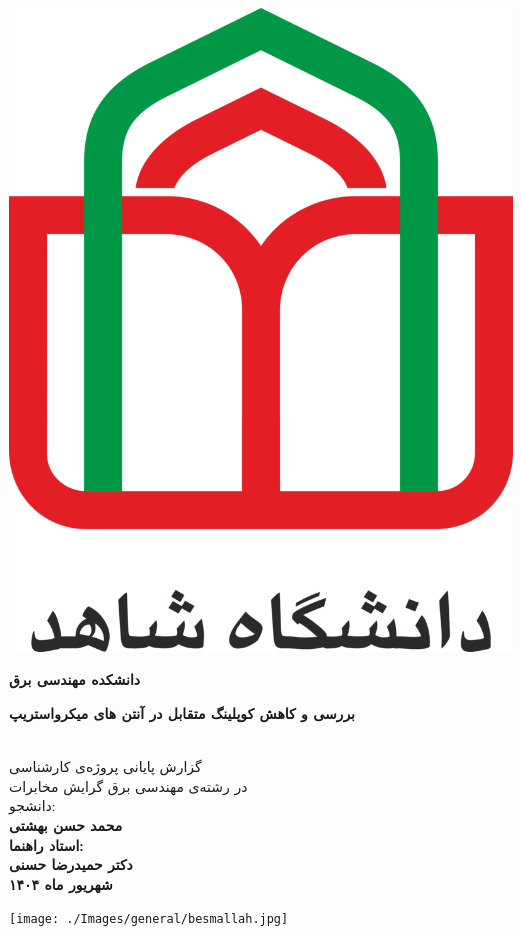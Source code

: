 
\thispagestyle{empty}
\vspace*{-28mm}
\centerline{\includegraphics[scale=0.1]{./Images/general/logo.png}}
\begin{center}
\vspace{-1mm}
\textbf{دانشکده مهندسی برق}
\\[3cm]
\begin{Huge}
\textbf{
بررسی و کاهش کوپلینگ متقابل در آنتن های میکرواستریپ
}
\end{Huge}
\\[1.5cm]
\Large
گزارش پایانی پروژه‌ی کارشناسی
\\[0.25cm]
در رشته‌ی مهندسی برق گرایش مخابرات
\\[3cm]
دانشجو:
\\[0.25cm]
\textbf{
محمد حسن بهشتی    
\\[1cm]
استاد راهنما:
\\[0.25cm]
دکتر حمیدرضا حسنی
\\[1cm]
شهریور ماه ۱۴۰۴
}
\end{center}
\newpage
\thispagestyle{empty}
\centerline{\texttt{[image: ./Images/general/besmallah.jpg]}}